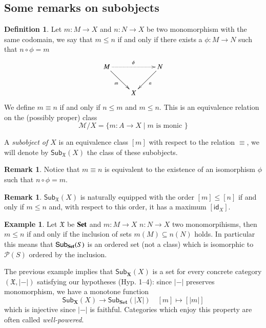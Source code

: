 \documentclass[12pt]{article}
\theoremstyle{definition}
\newtheorem{definition}[lemma]{Definition}
\newtheorem{remark}[lemma]{Remark}
\newtheorem{example}[lemma]{Example}
\def\X{\mathfrak X}
\newcommand{\Set}{\textbf{\textup{Set}}}
\numberwithin{equation}{section}
\newcommand{\catname}[1]{\mathbf{#1}}
\newcommand{\sub}[1]{\mathsf{Sub}_{\catname{#1}}}
\newcommand{\id}[1]{\mathsf{id}_{#1}}
\begin{document}
\subsection{Some remarks on subobjects}\label{subobjects}

\begin{definition} Let $m:M\rightarrow X$ and $n:N\rightarrow X$ be two monomorphism with the same codomain, we say that $m\leq n$ if and only if there exists a $\phi:M\rightarrow N$ such that $n\circ \phi=m$ 
	\[
	\xymatrix {M \ar@{.>}[rr]^{\phi} \ar[dr]_{m}&& N\ar[dl]^{n}\\
	& X}
	\]
We define $m\equiv n$ if and only if $n\leq m$ and $m\leq n$. This is an equivalence relation on the (possibly proper) class
\[\mathcal{M}/X=\{m:A\rightarrow X \mid m \text{ is monic }\}\]

A \emph{subobject of $X$} is an equivalence class $[m]$ with respect to the relation $\equiv$, we will denote by $\sub{\X}(X)$ the class of these subobjects.
\end{definition}

\begin{remark}
	Notice that $m\equiv n$ is equivalent to the existence of an isomorphism $\phi$ such that $n\circ \phi = m$. 
\end{remark}

\begin{remark}
	$\sub{\X}(X)$ is naturally equipped with the order $[m]\leq[n]$ if and only if $m\leq n$ and, with respect to this order, it has a maximum $[\id{X}]$.
\end{remark}

\begin{example}
	Let $\X$ be $\Set$ and $m:M\rightarrow X$ $n:N\rightarrow X$ two monomorpihisms, then $m\leq n$ if and only if the inclusion of sets $m(M)\subseteq n(N)$ holds. In particular this means that $\sub{\Set}(S)$ is an ordered set (not a class) which is isomorphic to $\mathcal{P}(S)$ ordered by the inclusion.
\end{example}

The previous example implies that $\sub{X}(X)$ is a set for every concrete category $(\X, |-|)$ satisfying our hypotheses (Hyp. 1--4): since $|-|$ preserves monomorphism, we have a monotone function
\[\sub{X}(X)\rightarrow\sub{Set}(|X|)\quad
[m]\mapsto [|m|]
\] 
which is injective since $|-|$ is faithful. Categories which enjoy this property are often called \emph{well-powered}.
\end{document}
